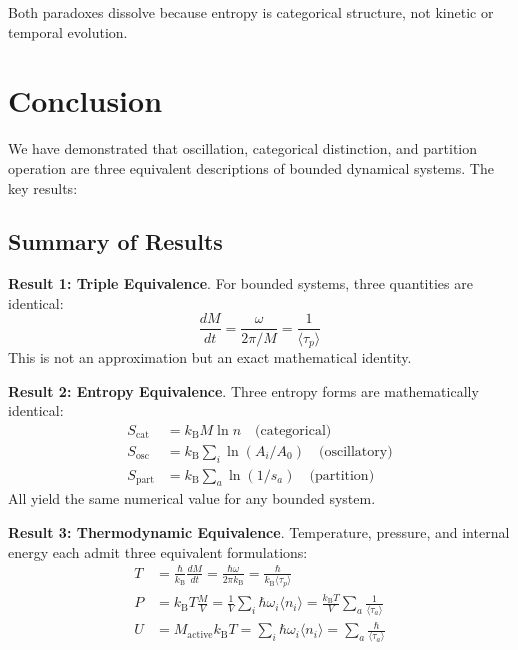 \documentclass[twocolumn,10pt]{article}
\theoremstyle{definition}
\theoremstyle{remark}
\newcommand{\kB}{k_{\mathrm{B}}}
\begin{document}
Both paradoxes dissolve because entropy is categorical structure, not kinetic or temporal evolution.

\section{Conclusion}
\label{sec:conclusion}

We have demonstrated that oscillation, categorical distinction, and partition operation are three equivalent descriptions of bounded dynamical systems. The key results:

\subsection{Summary of Results}

\textbf{Result 1: Triple Equivalence}. For bounded systems, three quantities are identical:
\begin{equation}
\frac{dM}{dt} = \frac{\omega}{2\pi/M} = \frac{1}{\langle\tau_p\rangle}
\end{equation}
This is not an approximation but an exact mathematical identity.

\textbf{Result 2: Entropy Equivalence}. Three entropy forms are mathematically identical:
\begin{align}
S_{\text{cat}} &= \kB M \ln n \quad \text{(categorical)} \\
S_{\text{osc}} &= \kB \sum_i \ln(A_i/A_0) \quad \text{(oscillatory)} \\
S_{\text{part}} &= \kB \sum_a \ln(1/s_a) \quad \text{(partition)}
\end{align}
All yield the same numerical value for any bounded system.

\textbf{Result 3: Thermodynamic Equivalence}. Temperature, pressure, and internal energy each admit three equivalent formulations:
\begin{align}
T &= \frac{\hbar}{\kB}\frac{dM}{dt} = \frac{\hbar\omega}{2\pi\kB} = \frac{\hbar}{\kB\langle\tau_p\rangle} \\
P &= \kB T \frac{M}{V} = \frac{1}{V}\sum_i \hbar\omega_i\langle n_i\rangle = \frac{\kB T}{V}\sum_a \frac{1}{\langle\tau_a\rangle} \\
U &= M_{\text{active}}\kB T = \sum_i \hbar\omega_i\langle n_i\rangle = \sum_a \frac{\hbar}{\langle\tau_a\rangle}
\end{align}
\end{document}
